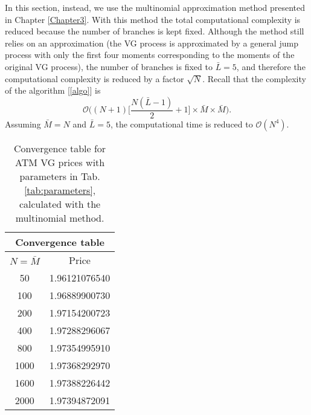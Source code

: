 In this section, instead, we use the multinomial approximation method presented in Chapter \ref{Chapter3}.%
With this method the total computational complexity is reduced because the number of branches is kept fixed.
Although the method still relies on an approximation (the VG process is approximated by a general jump process with only the first four moments corresponding to the moments of the 
original VG process),
the number of branches is fixed to $\bar L = 5$, and therefore the computational complexity is reduced by a factor $\sqrt{N}$.
Recall that the complexity of the algorithm [\ref{algo}] is 
$$\mathcal{O}\biggl( (N+1)\bigl[\frac{N(\bar L-1)}{2}+1 \bigr] \times \bar M \times \bar M \biggr).$$
Assuming $\bar M = N$ and $\bar L = 5$, the computational time is reduced to $\mathcal{O}(N^4)$. 
\begin{table}[t!]
\centering
 \begin{tabular}{||c|c||}
 \hline
  \multicolumn{2}{|c|}{Convergence table} \\
  \hline
  $N = \bar M$ & Price \\
  \hline
    50 & 1.96121076540 \\
  \hline
    100 & 1.96889900730 \\
  \hline  
    200 &  1.97154200723 \\
  \hline
    400 & 1.97288296067 \\
  \hline   
    800 & 1.97354995910  \\
  \hline
    1000 & 1.97368292970 \\ 
  \hline
    1600 & 1.97388226442  \\
  \hline
    2000 & 1.97394872091  \\  \hline
  \end{tabular}
  \caption{Convergence table for ATM VG prices with parameters in Tab. \ref{tab:parameters}, calculated with the multinomial method.}
  \label{tab:convergence31}
\end{table}

